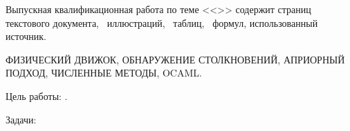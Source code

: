 
Выпускная квалификационная работа по теме <<\Topic>> содержит
\pageref{LastPage} страниц текстового документа, %
\totalfigures~иллюстраций,
\totaltables~таблиц,
\totalequations~формул,
 использованный источник.

\MakeUppercase{
    физический движок,
    обнаружение столкновений,
    априорный подход,
    численные методы,
    OCaml.
}

Цель работы: \Target.

Задачи:

\Tasks
